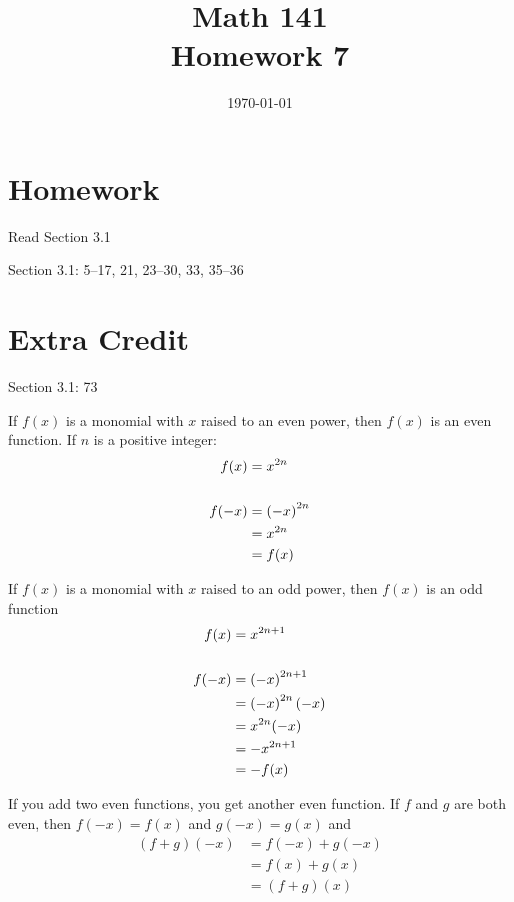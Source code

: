 \documentclass[landscape]{exam}
\date{\today}
\author{}
\title{Math 141 \\ Homework 7}
\begin{document}
\maketitle

\section{Homework}

\begin{itemize*}
  \item Read Section 3.1
  \item Section 3.1: 5--17, 21, 23--30, 33, 35--36
\end{itemize*}

\ifprintanswers{}
  \pagebreak
\fi

\section{Extra Credit}
Section 3.1: 73

\ifprintanswers{}

  If $f(x)$ is a monomial with $x$ raised to an even power, then $f(x)$ is an even function.  If $n$ is a positive
  integer:
  \begin{align*}
    f(x)  &= x^{2n} \\
    \\
    f(-x) &= \del{ -x }^{2n} \\
          &= x^{2n} \\
          &= f(x) \\
  \end{align*}

  If $f(x)$ is a monomial with $x$ raised to an odd power, then $f(x)$ is an odd function
  \begin{align*}
    f(x)  &= x^{2n + 1} \\
    \\
    f(-x) &= \del{ -x }^{2n + 1} \\
          &= \del{ -x }^{2n} (-x) \\
          &= x^{2n} (-x) \\
          &= -x^{2n + 1} \\
          &= -f(x) \\
  \end{align*}

  If you add two even functions, you get another even function.  If $f$ and $g$ are both even, then $f(-x) = f(x)$ and
  $g(-x) = g(x)$ and
  \begin{align*}
    (f + g)(-x) &= f(-x) + g(-x) \\
                &= f(x) + g(x) \\
                &= (f + g)(x) \\
  \end{align*}
\end{document}
